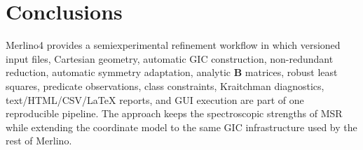 \documentclass[journal=jctcce,manuscript=article,maxauthors=999]{achemso}
\begin{document}
\section{Conclusions}

Merlino4 provides a semiexperimental refinement workflow in which versioned input files, Cartesian geometry, automatic GIC construction, non-redundant reduction, automatic symmetry adaptation, analytic $\mathbf{B}$ matrices, robust least squares, predicate observations, class constraints, Kraitchman diagnostics, text/HTML/CSV/\LaTeX{} reports, and GUI execution are part of one reproducible pipeline. The approach keeps the spectroscopic strengths of MSR while extending the coordinate model to the same GIC infrastructure used by the rest of Merlino.


\end{document}

